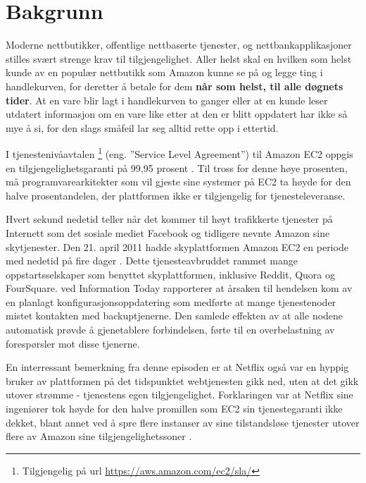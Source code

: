 \section{Bakgrunn} \label{1dot1}

Moderne nettbutikker, offentlige nettbaserte tjenester, og nettbankapplikasjoner stilles sv\-ært strenge krav til tilgjengelighet. Aller helst skal en hvilken som helst kunde av en populær nettbutikk som Amazon kunne se på og legge ting i handlekurven, for deretter å betale for dem \textbf{når som helst, til alle døgnets tider}. At en vare blir lagt i handlekurven to ganger eller at en kunde leser utdatert informasjon om en vare like etter at den er blitt oppdatert har ikke så mye å si, for den slags småfeil lar seg alltid rette opp i ettertid.

I tjenestenivåavtalen \footnote{Tilgjengelig på url \url{https://aws.amazon.com/ec2/sla/}} (eng. ''Service Level Agreement'') til Amazon EC2 oppgis en tilgjengelighetsgaranti på 99,95 prosent \citep{BCK2013}. Til tross for denne høye prosenten, må programvarearkitekter som vil gjeste sine systemer på EC2 ta høyde for den halve prosentandelen, der plattformen ikke er tilgjengelig for tjenesteleveranse.

Hvert sekund nedetid teller når det kommer til høyt trafikkerte tjenester på Internett som det sosiale mediet Facebook og tidligere nevnte Amazon sine skytjenester. Den 21. april 2011 hadde skyplattformen Amazon EC2 en periode med nedetid på fire dager \citep{BCK2013}. Dette tjenesteavbruddet rammet mange oppstartsselskaper som benyttet skyplattformen, inklusive Reddit, Quora og FourSquare. \cite{Schiller2011} ved Information Today rapporterer at årsaken til hendelsen kom av en planlagt konfigurasjonsoppdatering som medførte at mange tjenestenoder mistet kontakten med backuptjenerne. Den samlede effekten av at alle nodene automatisk prøvde å gjenetablere forbindelsen, førte til en overbelastning av forespørsler mot disse tjenerne.

En interressant bemerkning fra denne episoden er at Netflix også var en hyppig bruker av plattformen på det tidspunktet webtjenesten gikk ned, uten at det gikk utover strømme - tjenestens egen tilgjengelighet. Forklaringen var at Netflix sine ingeniører tok høyde for den halve promillen som EC2 sin tjenestegaranti ikke dekket, blant annet ved å spre flere instanser av sine tilstandsløse tjenester utover flere av Amazon sine tilgjengelighetssoner \citep{BCK2013}.

